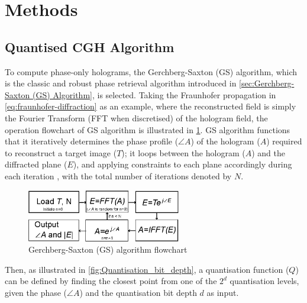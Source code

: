\section{Methods}

\subsection{Quantised CGH Algorithm}
	To compute phase-only holograms, the Gerchberg-Saxton (GS) \cite{Gerchberg1972} algorithm, which is the classic and robust phase retrieval algorithm introduced in \cref{sec:Gerchberg-Saxton (GS) Algorithm}, is selected. Taking the Fraunhofer propagation in \cref{eq:fraunhofer-diffraction} as an example, where the reconstructed field is simply the Fourier Transform (FFT when discretised) of the hologram field, the operation flowchart of GS algorithm is illustrated in \cref{fig:GS_flowchart}. GS algorithm functions that it iteratively determines the phase profile ($\angle A$) of the hologram ($A$) required to reconstruct a target image ($T$); it loops between the hologram ($A$) and the diffracted plane ($E$), and applying constraints to each plane accordingly during each iteration \cite{Gerchberg1972}, with the total number of iterations denoted by $N$.

	\begin{figure} [H]
	   \begin{center}
	   \includegraphics[width = 0.6\textwidth]{GS_flowchart.eps}
	   \end{center}
	   \caption{\label{fig:GS_flowchart} Gerchberg-Saxton (GS) algorithm flowchart}
	\end{figure}

	Then, as illustrated in \cref{fig:Quantisation_bit_depth}, a quantisation function ($Q$) can be defined by finding the closest point from one of the $2^d$ quantisation levels, given the phase ($\angle A$) and the quantisation bit depth $d$ as input.

